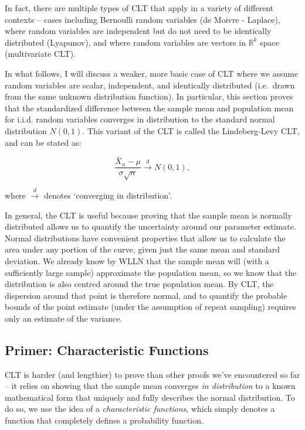 \documentclass[
]{book}
\begin{document}
In fact, there are multiple types of CLT that apply in a variety of different contexts -- cases including Bernoulli random variables (de Moivre - Laplace), where random variables are independent but do not need to be identically distributed (Lyapunov), and where random variables are vectors in \(\mathbb{R}^k\) space (multivariate CLT).

In what follows, I will discuss a weaker, more basic case of CLT where we assume random variables are scalar, independent, and identically distributed (i.e.~drawn from the same unknown distribution function). In particular, this section proves that the standardized difference between the sample mean and population mean for i.i.d. random variables converges in distribution to the standard normal distribution \(N(0,1)\). This variant of the CLT is called the Lindeberg-Levy CLT, and can be stated as:

\begin{equation}
  \frac{\bar{X}_n - \mu}{\sigma\sqrt{n}} \xrightarrow{d} N(0,1),
\end{equation}

where \(\xrightarrow{d}\) denotes `converging in distribution'.

In general, the CLT is useful because proving that the sample mean is normally distributed allows us to quantify the uncertainty around our parameter estimate. Normal distributions have convenient properties that allow us to calculate the area under any portion of the curve, given just the same mean and standard deviation. We already know by WLLN that the sample mean will (with a sufficiently large sample) approximate the population mean, so we know that the distribution is also centred around the true population mean. By CLT, the dispersion around that point is therefore normal, and to quantify the probable bounds of the point estimate (under the assumption of repeat sampling) requires only an estimate of the variance.

\hypertarget{primer-characteristic-functions}{%
\subsection{Primer: Characteristic Functions}\label{primer-characteristic-functions}}

CLT is harder (and lengthier) to prove than other proofs we've encountered so far -- it relies on showing that the sample mean converges \emph{in distribution} to a known mathematical form that uniquely and fully describes the normal distribution. To do so, we use the idea of a \emph{characteristic functions}, which simply denotes a function that completely defines a probability function.
\end{document}
